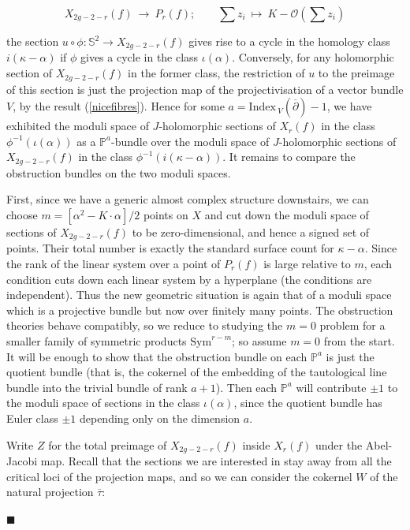 \documentclass[10pt]{article}
\newcommand{\pp}{\mathbb{P}}
\newcommand{\sss}{\mathbb{S}}
\newcommand{\cdbar}{\overline{\partial}}
\newcommand{\Sym}{\mathrm{Sym}}
\newcommand{\ind}{\mathrm{Index \,}}
\newenvironment{Pf}{\par \noindent{\sc Proof:} }{\quad $\blacksquare$ \par
\vspace{0.5cm}}
\begin{document}
\begin{Pf}
$$X_{2g-2-r}(f) \ \rightarrow \ P_r(f); \qquad \sum z_i \ \mapsto \ K
- \mathcal{O}(\sum z_i)$$

\noindent the section $u \circ \phi: \sss^2 \rightarrow X_{2g-2-r}(f)$
gives rise to a cycle in the homology class $i(\kappa - \alpha)$ if
$\phi$ gives a cycle in the class $\iota(\alpha)$.  Conversely, for
any holomorphic section of $X_{2g-2-r}(f)$ in the former class, the
restriction of $u$ to the preimage of this section is just the
projection map of the projectivisation of a vector bundle $V$, by the
result (\ref{nicefibres}).  Hence for some $a=\ind_V(\cdbar)-1$, we have
exhibited the moduli space of ${J}$-holomorphic sections of
$X_r(f)$ in the class $\phi^{-1}(\iota(\alpha))$ as a $\pp^a$-bundle over the
moduli space of ${J}$-holomorphic sections of $X_{2g-2-r}(f)$ in the
class $\phi^{-1}(i(\kappa - \alpha))$.   It remains to compare the
obstruction bundles on the two moduli spaces.  

\vspace{0.2cm}

\noindent First, since we have a generic almost complex structure
downstairs, we can choose $m = [\alpha^2 - K\cdot\alpha]/2$ points on
$X$ and cut down the moduli space of sections of $X_{2g-2-r}(f)$ to be
zero-dimensional, and hence a signed set of points.  Their total
number is exactly the standard surface count for
$\kappa-\alpha$.  Since the rank of the linear system over a
point of $P_r(f)$ is large relative to $m$, each condition cuts down
each linear system by a hyperplane (the conditions are independent).
Thus the new geometric situation is again that of a moduli space which
is a projective bundle but now over finitely many points.  The
obstruction theories behave compatibly,
so we reduce to studying the $m=0$ problem for a smaller family of
symmetric products $\Sym^{r-m}$; so assume $m=0$ from the start.  
It will be enough to show that the obstruction bundle on
each $\pp^a$ is just the quotient bundle (that is, the cokernel of the
embedding of the tautological line bundle into the trivial bundle of
rank $a+1$).  Then each $\pp^a$ will
contribute $\pm 1$ to the moduli space of sections in the class
$\iota(\alpha)$, since the quotient bundle has Euler class $\pm 1$
depending only on the dimension $a$.

\vspace{0.2cm}

\noindent Write $Z$ for the total preimage of $X_{2g-2-r}(f)$ inside
$X_r(f)$ under the Abel-Jacobi map.  Recall that the
sections we are interested in stay away from all the critical loci of
the projection maps, and so we can consider the cokernel $W$ of the
natural projection $\overline{\tau}$:


\end{Pf}
\end{document}
